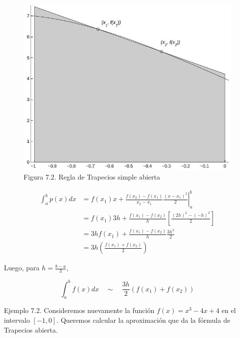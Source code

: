\documentclass[10pt]{book}
\begin{document}
\begin{figure}[h]
\begin{center}
  \includegraphics[width=\textwidth]{2025_09_05_3888c9ac96bd653d96b4g-140}
\captionsetup{labelformat=empty}
\caption{Figura 7.2. Regla de Trapecios simple abierta}
\end{center}
\end{figure}

$$
\begin{aligned}
\int_{a}^{b} p(x) d x & =f\left(x_{1}\right) x+\left.\frac{f\left(x_{2}\right)-f\left(x_{1}\right)}{x_{2}-x_{1}} \frac{\left(x-x_{1}\right)^{2}}{2}\right|_{a} ^{b} \\
& =f\left(x_{1}\right) 3 h+\frac{f\left(x_{1}\right)-f\left(x_{2}\right)}{h}\left[\frac{(2 h)^{2}-(-h)^{2}}{2}\right] \\
& =3 h f\left(x_{1}\right)+\frac{f\left(x_{1}\right)-f\left(x_{2}\right)}{h} \frac{3 h^{2}}{2} \\
& =3 h\left(\frac{f\left(x_{1}\right)+f\left(x_{2}\right)}{2}\right)
\end{aligned}
$$

Luego, para $h=\frac{b-a}{3}$,


\begin{equation*}
\int_{a}^{b} f(x) d x \quad \sim \quad \frac{3 h}{2}\left(f\left(x_{1}\right)+f\left(x_{2}\right)\right) \tag{7.3}
\end{equation*}


Ejemplo 7.2. Consideremos nuevamente la función $f(x)=x^{3}-4 x+4$ en el intervalo $[-1,0]$. Queremos calcular la aproximación que da la fórmula de Trapecios abierta.
\end{document}
